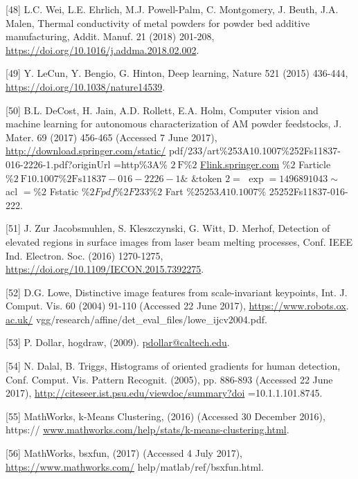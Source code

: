 \documentclass[10pt]{article}
\begin{document}
[48] L.C. Wei, L.E. Ehrlich, M.J. Powell-Palm, C. Montgomery, J. Beuth, J.A. Malen, Thermal conductivity of metal powders for powder bed additive manufacturing, Addit. Manuf. 21 (2018) 201-208, \href{https://doi.org/10.1016/j.addma.2018.02.002}{https://doi.org/10.1016/j.addma.2018.02.002}.

[49] Y. LeCun, Y. Bengio, G. Hinton, Deep learning, Nature 521 (2015) 436-444, \href{https://doi.org/10.1038/nature14539}{https://doi.org/10.1038/nature14539}.

[50] B.L. DeCost, H. Jain, A.D. Rollett, E.A. Holm, Computer vision and machine learning for autonomous characterization of AM powder feedstocks, J. Mater. 69 (2017) 456-465 (Accessed 7 June 2017), \href{http://download.springer.com/static/}{http://download.springer.com/static/} pdf/233/art\%253A10.1007\%252Fs11837-016-2226-1.pdf?originUrl =http\%3A\% $2 \mathrm{~F} \% 2$ \href{http://Flink.springer.com}{Flink.springer.com} $\% 2$ Farticle $\% 2 \mathrm{~F} 10.1007 \% 2 \mathrm{Fs} 11837-016-2226-1 \&$ \&token $2=$ $\exp =1496891043 \sim$ acl $=\% 2$ Fstatic $\% 2 F p d f \% 2 F 233 \% 2$ Fart $\% 25253 A 10.1007 \%$ 25252Fs11837-016-222.

[51] J. Zur Jacobsmuhlen, S. Kleszczynski, G. Witt, D. Merhof, Detection of elevated regions in surface images from laser beam melting processes, Conf. IEEE Ind. Electron. Soc. (2016) 1270-1275, \href{https://doi.org/10.1109/IECON.2015.7392275}{https://doi.org/10.1109/IECON.2015.7392275}.

[52] D.G. Lowe, Distinctive image features from scale-invariant keypoints, Int. J. Comput. Vis. 60 (2004) 91-110 (Accessed 22 June 2017), \href{https://www.robots.ox}{https://www.robots.ox}. \href{http://ac.uk/}{ac.uk/} vgg/research/affine/det\_eval\_files/lowe\_ijcv2004.pdf.

[53] P. Dollar, hogdraw, (2009). \href{mailto:pdollar@caltech.edu}{pdollar@caltech.edu}.

[54] N. Dalal, B. Triggs, Histograms of oriented gradients for human detection, Conf. Comput. Vis. Pattern Recognit. (2005), pp. 886-893 (Accessed 22 June 2017), \href{http://citeseer.ist.psu.edu/viewdoc/summary?doi}{http://citeseer.ist.psu.edu/viewdoc/summary?doi} =10.1.1.101.8745.

[55] MathWorks, k-Means Clustering, (2016) (Accessed 30 December 2016), https:// \href{http://www.mathworks.com/help/stats/k-means-clustering.html}{www.mathworks.com/help/stats/k-means-clustering.html}.

[56] MathWorks, bsxfun, (2017) (Accessed 4 July 2017), \href{https://www.mathworks.com/}{https://www.mathworks.com/} help/matlab/ref/bsxfun.html.
\end{document}
